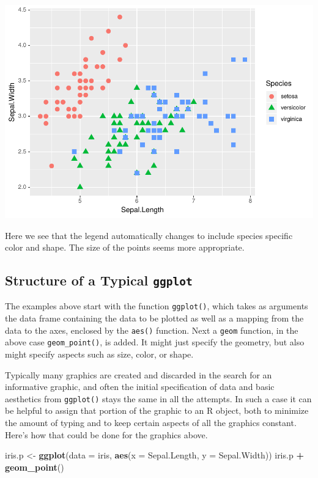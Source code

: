 \documentclass[
]{krantz}
\makeatletter
\newenvironment{Shaded}{\begin{snugshade}}{\end{snugshade}}
\newcommand{\DataTypeTok}[1]{\textcolor[rgb]{0.27,0.27,0.27}{#1}}
\newcommand{\KeywordTok}[1]{\textcolor[rgb]{0.27,0.27,0.27}{\textbf{#1}}}
\newcommand{\NormalTok}[1]{#1}
\newcommand{\OperatorTok}[1]{\textcolor[rgb]{0.43,0.43,0.43}{\textbf{#1}}}
\newcommand{\StringTok}[1]{\textcolor[rgb]{0.5,0.5,0.5}{#1}}
\newenvironment{kframe}{%
\medskip{}
\setlength{\fboxsep}{.8em}
 \def\at@end@of@kframe{}%
 \ifinner\ifhmode%
  \def\at@end@of@kframe{\end{minipage}}%
  \begin{minipage}{\columnwidth}%
 \fi\fi%
 \def\FrameCommand##1{\hskip\@totalleftmargin \hskip-\fboxsep
 \colorbox{shadecolor}{##1}\hskip-\fboxsep
     \hskip-\linewidth \hskip-\@totalleftmargin \hskip\columnwidth}%
 \MakeFramed {\advance\hsize-\width
   \@totalleftmargin\z@ \linewidth\hsize
   \@setminipage}}%
 {\par\unskip\endMakeFramed%
 \at@end@of@kframe}
\renewenvironment{Shaded}{\begin{kframe}}{\end{kframe}}
\makeatother
\begin{document}
\includegraphics{bookdown_files/figure-latex/unnamed-chunk-60-1.pdf}

Here we see that the legend automatically changes to include species specific color and shape. The size of the points seems more appropriate.

\hypertarget{structure-of-a-typical-ggplot}{%
\subsection{\texorpdfstring{Structure of a Typical \texttt{ggplot}}{Structure of a Typical ggplot}}\label{structure-of-a-typical-ggplot}}

The examples above start with the function \texttt{ggplot()}, which takes as arguments the data frame containing the data to be plotted as well as a mapping from the data to the axes, enclosed by the \texttt{aes()} function. Next a \texttt{geom} function, in the above case \texttt{geom\_point()}, is added. It might just specify the geometry, but also might specify aspects such as size, color, or shape.

Typically many graphics are created and discarded in the search for an informative graphic, and often the initial specification of data and basic aesthetics from \texttt{ggplot()} stays the same in all the attempts. In such a case it can be helpful to assign that portion of the graphic to an R object, both to minimize the amount of typing and to keep certain aspects of all the graphics constant. Here's how that could be done for the graphics above.

\begin{Shaded}
\begin{Highlighting}[]
\NormalTok{iris.p \textless{}{-}}\StringTok{ }\KeywordTok{ggplot}\NormalTok{(}\DataTypeTok{data =}\NormalTok{ iris, }\KeywordTok{aes}\NormalTok{(}\DataTypeTok{x =}\NormalTok{ Sepal.Length, }\DataTypeTok{y =}\NormalTok{ Sepal.Width)) }
\NormalTok{iris.p }\OperatorTok{+}\StringTok{ }\KeywordTok{geom\_point}\NormalTok{()}
\end{Highlighting}
\end{Shaded}
\end{document}
